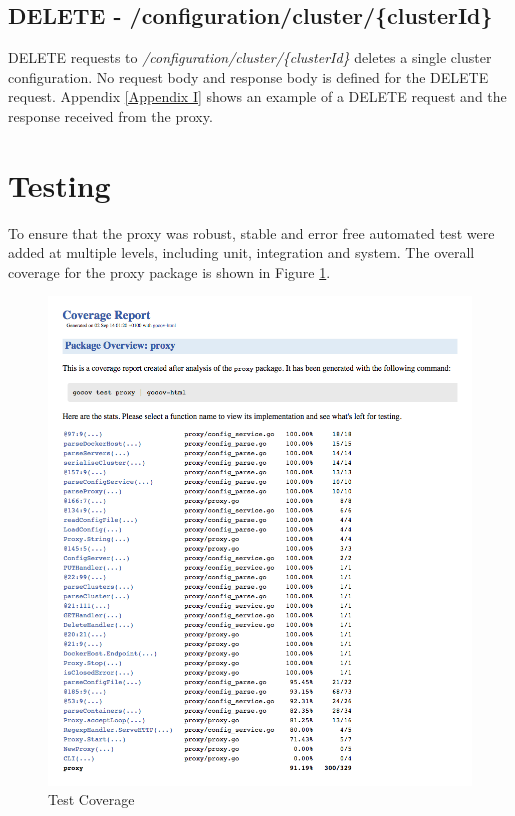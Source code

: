 \documentclass[a4paper,11pt,twoside]{report}
\begin{document}
\subsection{DELETE - /configuration/cluster/\{clusterId\}}
DELETE requests to \textit{/configuration/cluster/\{clusterId\}} deletes a single cluster configuration. No request body and response body is defined for the DELETE request. Appendix \ref{Appendix I} shows an example of a DELETE request and the response received from the proxy.

\section{Testing}
To ensure that the proxy was robust, stable and error free automated test were added at multiple levels, including unit, integration and system.  The overall coverage for the proxy package is shown in Figure \ref{coverage}.

\begin{figure}[!ht]
  \centering
     \includegraphics[scale=0.55]{coverage}
  \caption{Test Coverage}
  \label{coverage}
\end{figure}
\end{document}
